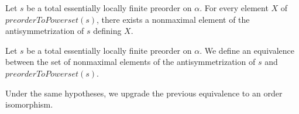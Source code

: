 \begin{sublemma}
Let $s$ be a total essentially locally finite preorder on $\alpha$. For every element $X$ of $preorderToPowerset(s)$, there exists
a nonmaximal element of the antisymmetrization of $s$ defining $X$.

\end{sublemma}

\begin{subdefi}
Let $s$ be a total essentially locally finite preorder on $\alpha$. We define an equivalence between the set of nonmaximal elements
of the antisymmetrization of $s$ and $preorderToPowerset(s)$.

\end{subdefi}

\begin{subdefi}
Under the same hypotheses, we upgrade the previous equivalence to an order isomorphism.

\end{subdefi}